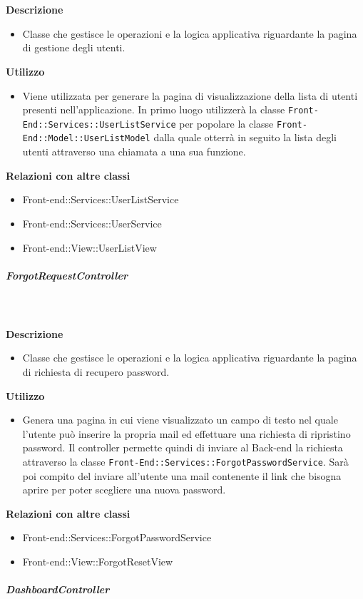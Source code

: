 				\textbf{\\ \\ Descrizione} 
					\begin{itemize}
						\item[] Classe che gestisce le operazioni e la logica applicativa riguardante la pagina di gestione degli utenti.
					\end{itemize}      
				\textbf{Utilizzo}  
					\begin{itemize}
						\item[] Viene utilizzata per generare la pagina di visualizzazione della lista di utenti presenti nell'applicazione. In primo luogo utilizzerà la classe \texttt{Front-End::Services::UserListService} per popolare la classe \texttt{Front-End::Model::UserListModel} dalla quale otterrà in seguito la lista degli utenti attraverso una chiamata a una sua funzione.
					\end{itemize}
					\textbf{Relazioni con altre classi}
					\begin{itemize}
							\item{Front-end::Services::UserListService}
							\item{Front-end::Services::UserService}
							\item{Front-end::View::UserListView}
					\end{itemize}
			\subparagraph{ForgotRequestController}
				
				\textbf{\\ \\ Descrizione} 
					\begin{itemize}
						\item[] Classe che gestisce le operazioni e la logica applicativa riguardante la pagina di richiesta di recupero password.
					\end{itemize}      
				\textbf{Utilizzo}  
					\begin{itemize}
						\item[] Genera una pagina in cui viene visualizzato un campo di testo nel quale l'utente può inserire la propria mail ed effettuare una richiesta di ripristino password. Il controller permette quindi di inviare al Back-end la richiesta attraverso la classe \texttt{Front-End::Services::ForgotPasswordService}. Sarà poi compito del  inviare all'utente una mail contenente il link che bisogna aprire per poter scegliere una nuova password.
					\end{itemize}
					\textbf{Relazioni con altre classi}
					\begin{itemize}
							\item{Front-end::Services::ForgotPasswordService}
							\item{Front-end::View::ForgotResetView}
					\end{itemize}
			\subparagraph{DashboardController}
				
